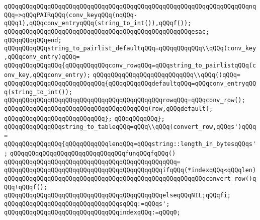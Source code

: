 \verb|qQQqqQQqqQQqqQQqqQQqqQQqqQQqqQQqqQQqqQQqqQQqqQQqqQQqqQQqqQQqqQQqqQQqnqQQq=>qQQqPAIRqQQq(conv_keyqQQq(nqQQq-qQQq1),qQQqconv_entryqQQq(string_to_int()),qQQqf());|\newline
\verb|qQQqqQQqqQQqqQQqqQQqqQQqqQQqqQQqqQQqqQQqqQQqqQQqqQQqesac;|\newline
\verb|qQQqqQQqqQQqend;|\newline
\newline
\verb|qQQqqQQqqQQqstring_to_pairlist_defaultqQQq=qQQqqQQqqQQq\\qQQq(conv_key,qQQqconv_entry)qQQq=|\newline
\verb|qQQqqQQqqQQqqQQq{qQQqqQQqqQQqconv_rowqQQq=qQQqstring_to_pairlistqQQq(conv_key,qQQqconv_entry);|\newline
\verb|qQQqqQQqqQQqqQQqqQQqqQQqqQQq\\qQQq()qQQq=|\newline
\verb|qQQqqQQqqQQqqQQqqQQqqQQqqQQq{qQQqqQQqqQQqdefaultqQQq=qQQqconv_entryqQQq(string_to_int());|\newline
\verb|qQQqqQQqqQQqqQQqqQQqqQQqqQQqqQQqqQQqqQQqqQQqrowqQQq=qQQqconv_row();|\newline
\verb|qQQqqQQqqQQqqQQqqQQqqQQqqQQqqQQqqQQqqQQq(row,qQQqdefault);|\newline
\verb|qQQqqQQqqQQqqQQqqQQqqQQqqQQq};|\newline
\verb|qQQqqQQqqQQq};|\newline
\newline
\verb|qQQqqQQqqQQqqQQqstring_to_tableqQQq=qQQq\\qQQq(convert_row,qQQqs')qQQq=|\newline
\verb|qQQqqQQqqQQqqQQq{qQQqqQQqqQQqlenqQQq=qQQqstring::length_in_bytesqQQqs';|\newline
\verb|qQQqqQQqqQQqqQQqqQQqqQQqqQQqqQQqfunqQQqfqQQq()|\newline
\verb|qQQqqQQqqQQqqQQqqQQqqQQqqQQqqQQqqQQqqQQqqQQqqQQq=|\newline
\verb|qQQqqQQqqQQqqQQqqQQqqQQqqQQqqQQqqQQqqQQqqQQqifqQQq(*indexqQQq<qQQqlen)|\newline
\verb|qQQqqQQqqQQqqQQqqQQqqQQqqQQqqQQqqQQqqQQqqQQqqQQqqQQqqQQqconvert_row()qQQq!qQQqf();|\newline
\verb|qQQqqQQqqQQqqQQqqQQqqQQqqQQqqQQqqQQqqQQqqQQqelseqQQqNIL;qQQqfi;|\newline
\verb|qQQqqQQqqQQqqQQqqQQqqQQqqQQqqQQqsqQQq:=qQQqs';|\newline
\verb|qQQqqQQqqQQqqQQqqQQqqQQqqQQqqQQqindexqQQq:=qQQq0;|\newline
